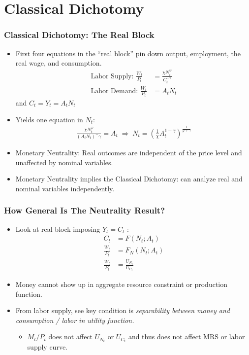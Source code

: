 \documentclass[english,xcolor=svgnames]{beamer}
\begin{document}
\section{Classical Dichotomy}

\begin{frame}
\frametitle{Classical Dichotomy: The Real Block
}
\begin{itemize}
	\item First four equations in the ``real block'' pin down output, employment, the real wage, and consumption.
	\begin{align*}
		\text{Labor Supply: }\frac{W_t}{P_t}&=\frac{\chi N_t^\varphi}{C_t^{-\gamma}}\\
		\text{Labor Demand: }\frac{W_t}{P_t}&= A_tN_{t} 
	\end{align*}
	and $C_t=Y_t=A_tN_t $
	\item Yields one equation in $N_t$:
	\begin{align*}
		\frac{\chi N_t^\varphi}{(A_tN_t )^-\gamma}= A_t \;\Rightarrow\;N_t=\left(\frac{1}{\chi}A_{t}^{1-\gamma}\right)^{\frac{1}{\varphi+\gamma }}
	\end{align*}
	\item Monetary Neutrality: Real outcomes are independent of the price level and unaffected by nominal variables.
	\item Monetary Neutrality implies the Classical Dichotomy: can analyze real and nominal variables independently.
\end{itemize}
\end{frame}




\begin{frame}
\frametitle{How General Is The Neutrality Result?
}
\begin{itemize}
	\item Look at real block imposing $Y_t=C_t$ :
	\begin{align*}
	C_t&=F(N_t;A_t) \\
	\frac{W_t}{P_t}&=F_N(N_t;A_t) \\
	\frac{W_t}{P_t}&=\frac{U_{N_t}}{U_{C_t}} 
\end{align*}
	\item Money cannot show up in aggregate resource constraint or
production function.
	\item From labor supply, see key condition is \emph{separability between
money and consumption / labor in utility function.}
	\begin{itemize}
		\item $M_t/P_t$ does not affect $U_{N_t}$ or $U_{C_t}$ and thus does not affect MRS or labor supply curve.
	\end{itemize}
\end{itemize}
\end{frame}
\end{document}
